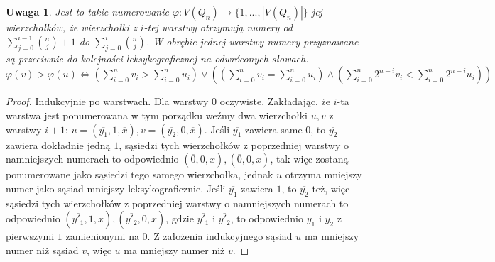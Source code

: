 \documentclass{pracamgr}
\newtheorem{remark}[theorem]{Uwaga}
\begin{document}
    \begin{remark}\label{numerowanie warstwowe 2}
     Jest to takie numerowanie $\varphi:V(Q_n)\rightarrow\{1,...,|V(Q_n)|\}$ jej wierzchołków,
     że wierzchołki z $i$-tej warstwy otrzymują numery od $\sum_{j=0}^{i-1}{n\choose j}+1$ do $\sum_{j=0}^{i}{n\choose j}$.
     W obrębie jednej warstwy numery przyznawane są przeciwnie do kolejności leksykograficznej na odwróconych słowach.
     $\varphi(v)>\varphi(u)\Leftrightarrow (\sum_{i=0}^n v_i>\sum_{i=0}^n u_i)
     \vee((\sum_{i=0}^n v_i=\sum_{i=0}^n u_i)\wedge(\sum_{i=0}^n2^{n-i}v_i<\sum_{i=0}^n2^{n-i}u_i))$
    \end{remark}
    \begin{proof}
     Indukcyjnie po warstwach.\newline
     Dla warstwy $0$ oczywiste.\newline
     Zakładając, że $i$-ta warstwa jest ponumerowana w tym porządku weźmy dwa wierzchołki $u,v$ z warstwy $i+1$:
     $u=(\overline{y_1},1,\overline{x}),v=(\overline{y_2},0,\overline{x})$.\newline
     Jeśli $\overline{y_1}$ zawiera same $0$, to $\overline{y_2}$ zawiera dokładnie jedną $1$, sąsiedzi tych wierzchołków z poprzedniej warstwy
     o namniejszych numerach to odpowiednio $(\overline{0},0,x),(\overline{0},0,x)$,
     tak więc zostaną ponumerowane jako sąsiedzi tego samego wierzchołka, jednak $u$ otrzyma mniejszy numer jako sąsiad mniejszy leksykograficznie.\newline
     Jeśli $\overline{y_1}$ zawiera $1$, to $\overline{y_2}$ też, więc sąsiedzi tych wierzchołków z poprzedniej warstwy
     o namniejszych numerach to odpowiednio $(\overline{y'_1},1,\overline{x}),(\overline{y'_2},0,\overline{x})$, gdzie $\overline{y'_1}$ i $\overline{y'_2}$,
     to odpowiednio $\overline{y_1}$ i $\overline{y_2}$ z pierwszymi $1$ zamienionymi na $0$. Z założenia indukcyjnego sąsiad $u$ ma mniejszy numer niż sąsiad $v$,
     więc $u$ ma mniejszy numer niż $v$.
    \end{proof}
\end{document}
